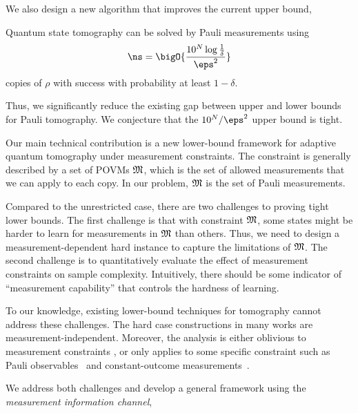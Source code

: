 We also design a new algorithm that improves the current upper bound,
\begin{theorem}
 {Quantum state tomography} can be solved by Pauli measurements  using 
 $$\ns = \bigO{\frac{10^N\log\frac{1}{\delta}}{\eps^2}}$$ copies of $\rho$ with success with probability at least $1-\delta$.
 \label{thm:pauli-upper}
 \end{theorem}

Thus, we significantly reduce the existing gap between upper and lower bounds for Pauli tomography. We conjecture that the $10^{\nqubits}/\eps^2$ upper bound is tight.

Our main technical contribution is a new lower-bound framework for adaptive quantum tomography under measurement constraints. The constraint is generally described by a set of POVMs ${\mathfrak{M}}$, which is the set of allowed measurements that we can apply to each copy. In our problem, ${\mathfrak{M}}$ is the set of Pauli measurements.

Compared to the unrestricted case, there are two challenges to proving tight lower bounds. 
The first challenge is that with constraint ${\mathfrak{M}}$, some states might be harder to learn for measurements in ${\mathfrak{M}}$ than others. 
Thus, we need to design a measurement-dependent hard instance to capture the limitations of ${\mathfrak{M}}$. The second challenge is to quantitatively evaluate the effect of measurement constraints on sample complexity. 
Intuitively, there should be some indicator of ``measurement capability'' that controls the hardness of learning. 

To our knowledge, existing lower-bound techniques for tomography cannot address these challenges. The hard case constructions in many works \cite{ODonnellW16, HaahHJWY17,chen2023does,lowe2022lower} are measurement-independent. Moreover, the analysis is either oblivious to measurement constraints \cite{ODonnellW16, HaahHJWY17,chen2023does}, or only applies to some specific constraint such as Pauli observables~\cite{Flammia_2012} and constant-outcome measurements~\cite{lowe2022lower}.

We address both challenges and develop a general framework using the \emph{measurement information channel},


